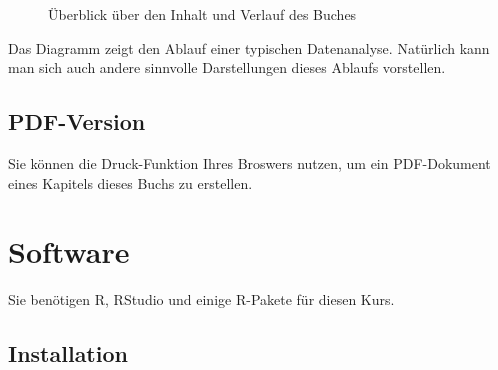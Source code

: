 \documentclass[
  a4paper,
  DIV=11]{scrreprt}
\begin{document}
\begin{figure}


\caption{\label{fig-ueberblick}Überblick über den Inhalt und Verlauf des
Buches}

\end{figure}%

Das Diagramm zeigt den Ablauf einer typischen Datenanalyse. Natürlich
kann man sich auch andere sinnvolle Darstellungen dieses Ablaufs
vorstellen.

\subsection{PDF-Version}\label{pdf-version}

Sie können die Druck-Funktion Ihres Broswers nutzen, um ein PDF-Dokument
eines Kapitels dieses Buchs zu erstellen.

\section{Software}\label{software}

Sie benötigen R, RStudio und einige R-Pakete für diesen Kurs.

\subsection{Installation}\label{installation}
\end{document}
